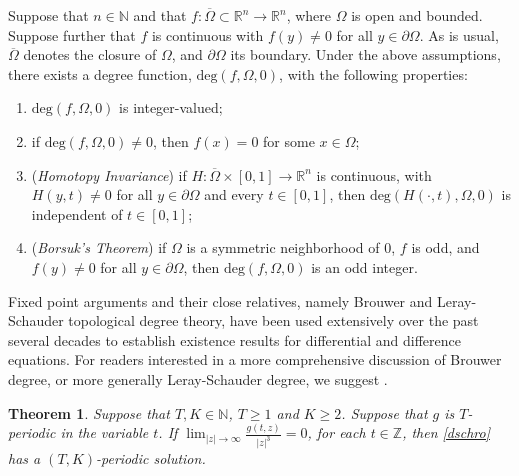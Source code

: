 \documentclass[12 pt,twoside]{amsart}
\newcommand{\R}{\mathbb{R}}
\newcommand{\N}{\mathbb{N}}
\newcommand{\Z}{\mathbb{Z}}
\newcommand{\ov}{\overline}
\newcommand{\ben}{\begin{enumerate}}
\newcommand{\een}{\end{enumerate}}
\newcommand{\bdeg}{\text{deg}}
\numberwithin{equation}{section}
\newtheorem{theorem}{Theorem}[section]
\theoremstyle{definition}
\theoremstyle{remark}
\begin{document}
Suppose that $n\in \N$ and that $f:\ov{\Omega}\subset \R^n\to\R^n$, where $\Omega$ is open and bounded.  Suppose further that $f$ is continuous with $f(y)\neq 0$ for all $y\in \partial \Omega$.  As is usual, $\ov{\Omega}$ denotes the closure of $\Omega$, and $\partial \Omega$ its boundary. Under the above assumptions,  there exists a degree function, $\bdeg(f,\Omega, 0)$, with the following properties:
\ben
\item[(a)] $\bdeg(f,\Omega,0)$ is integer-valued;
\item[(b)] if $\bdeg(f,\Omega,0)\neq 0$, then $f(x)=0$ for some $x\in\Omega$;
\item[(c)] ({\em Homotopy Invariance})  if $H:\ov{\Omega}\times[0,1]\to\R^n$ is continuous, with $H(y,t)\neq0$ for all $y\in \partial \Omega$ and every $t\in[0,1]$, then $\bdeg(H(\cdot,t),\Omega,0)$ is independent of $t\in [0,1]$; 
\item[(d)] ({\em Borsuk's Theorem}) if $\Omega$ is a symmetric neighborhood of $0$, $f$ is odd, and $f(y)\neq 0$ for all $y\in \partial \Omega$,  then $\bdeg(f,\Omega, 0)$ is an odd integer. 
\een

Fixed point arguments and their close relatives, namely Brouwer and Leray-Schauder topological degree theory, have been used extensively over the past several decades to establish existence results for differential and difference equations. For readers interested in a more comprehensive discussion of Brouwer degree, or more generally Leray-Schauder degree, we suggest \cite{Deimling,Rouche}.



\begin{theorem}\label{dnlsperiodic}
Suppose that $T,K\in \N$, $T\geq 1$ and $K\geq 2$. Suppose that $g$ is $T$-periodic in the variable $t$.  If $\lim_{|z|\to \infty} \frac{g(t,z)}{|z|^3}=0$, for each $t\in \Z$, then \eqref{dschro} has a $(T,K)$-periodic solution.
\end{theorem}
\end{document}
